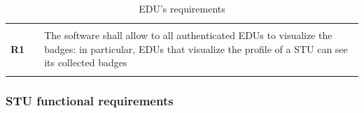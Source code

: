 \begin{table}[H]
\begin{tabular}{l l p{12cm}}
                     &        &                                                                                                                                                                         \\\hline & & \\
        \textbf{R1} & \vline & The software shall allow to all authenticated EDUs to visualize the badges: in particular, EDUs that visualize the profile of a STU can see its collected badges\\
                    &        &                            \\
        \hline
    \end{tabular}
    \caption{EDU's requirements}
\end{table}


\subsubsection*{STU functional requirements}
